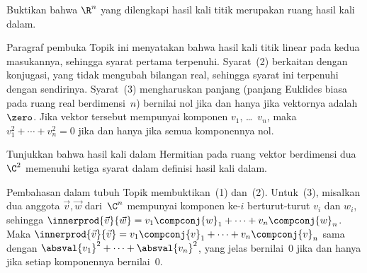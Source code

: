 \begin{exercises}
\item 
Buktikan bahwa $\R^n$ yang dilengkapi hasil kali titik merupakan ruang hasil
kali dalam.
\begin{answer}
Paragraf pembuka Topik ini menyatakan bahwa hasil kali titik linear pada kedua
masukannya, sehingga syarat pertama terpenuhi.
Syarat~(2) berkaitan dengan konjugasi, yang tidak mengubah bilangan real,
sehingga syarat ini terpenuhi dengan sendirinya.
Syarat~(3) mengharuskan panjang (panjang Euklides biasa pada ruang real
berdimensi~$n$) bernilai nol jika dan hanya jika vektornya adalah~$\zero$.
Jika vektor tersebut mempunyai komponen $v_1$, \ldots~$v_n$, maka
$v_1^2+\cdots+v_n^2=0$ jika dan hanya jika semua komponennya nol.
\end{answer}

\item
Tunjukkan bahwa hasil kali dalam Hermitian pada ruang vektor berdimensi dua
$\C^2$ memenuhi ketiga syarat dalam definisi hasil kali dalam.
\begin{answer}
Pembahasan dalam tubuh Topik membuktikan~(1) dan~(2).
Untuk~(3), misalkan dua anggota $\vec{v},\vec{w}$ dari~$\C^n$
mempunyai komponen ke-$i$ berturut-turut $v_i$ dan $w_i$, sehingga
$\innerprod{\vec{v}}{\vec{w}}=v_1\compconj{w}_1+\cdots+v_n\compconj{w}_n$.
Maka $\innerprod{\vec{v}}{\vec{v}}=v_1\compconj{v}_1+\cdots+v_n\compconj{v}_n$
sama dengan $\absval{v_1}^2+\cdots+\absval{v_n}^2$,
yang jelas bernilai~$0$ jika dan hanya jika setiap komponennya bernilai~$0$.
\end{answer}


\end{exercises}
